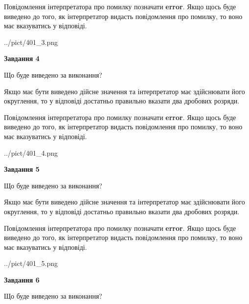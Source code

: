 \documentclass[12pt, ukrainian]{article}
\begin{document}
{\begin {Large}
Повідомлення інтерпретатора про помилку позначати \textbf{error}.
Якщо щось буде виведено до того, як інтерпретатор видасть повідомлення про помилку, 
то воно має вказуватись у відповіді. \par

\begin{center}
	{../pict/401_3.png}
\end{center}
\newpage

{\begin {center}\textbf{Завдання 4}\end {center}}\par
Що буде виведено за виконання? \par

Якщо має бути виведено дійсне значення та інтерпретатор має здійснювати його округлення, 
то у відповіді достатньо правильно вказати два дробових розряди.

Повідомлення інтерпретатора про помилку позначати \textbf{error}.
Якщо щось буде виведено до того, як інтерпретатор видасть повідомлення про помилку, 
то воно має вказуватись у відповіді. \par

\begin{center}
	{../pict/401_4.png}
\end{center}
\newpage

{\begin {center}\textbf{Завдання 5}\end {center}}\par
Що буде виведено за виконання? \par

Якщо має бути виведено дійсне значення та інтерпретатор має здійснювати його округлення, 
то у відповіді достатньо правильно вказати два дробових розряди.

Повідомлення інтерпретатора про помилку позначати \textbf{error}.
Якщо щось буде виведено до того, як інтерпретатор видасть повідомлення про помилку, 
то воно має вказуватись у відповіді. \par

\begin{center}
	{../pict/401_5.png}
\end{center}
\newpage

{\begin {center}\textbf{Завдання 6}\end {center}}\par
Що буде виведено за виконання? \par


\end{Large}}
\end{document}
